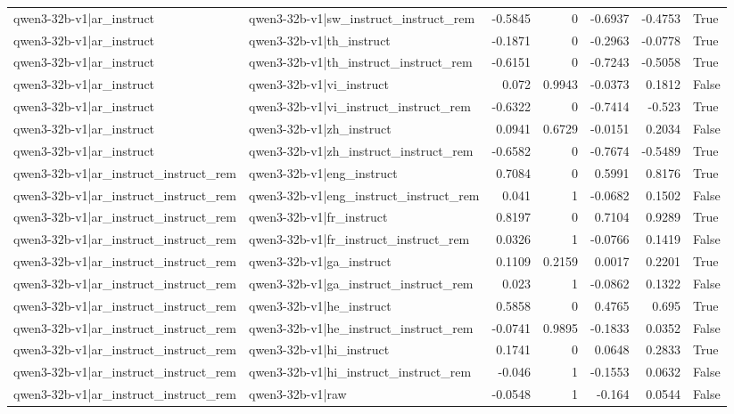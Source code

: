 \begin{table}
\begin{tabular}{l l r r r r l}
qwen3-32b-v1|ar_instruct & qwen3-32b-v1|sw_instruct_instruct_rem & -0.5845 & 0 & -0.6937 & -0.4753 & True \\
qwen3-32b-v1|ar_instruct & qwen3-32b-v1|th_instruct & -0.1871 & 0 & -0.2963 & -0.0778 & True \\
qwen3-32b-v1|ar_instruct & qwen3-32b-v1|th_instruct_instruct_rem & -0.6151 & 0 & -0.7243 & -0.5058 & True \\
qwen3-32b-v1|ar_instruct & qwen3-32b-v1|vi_instruct & 0.072 & 0.9943 & -0.0373 & 0.1812 & False \\
qwen3-32b-v1|ar_instruct & qwen3-32b-v1|vi_instruct_instruct_rem & -0.6322 & 0 & -0.7414 & -0.523 & True \\
qwen3-32b-v1|ar_instruct & qwen3-32b-v1|zh_instruct & 0.0941 & 0.6729 & -0.0151 & 0.2034 & False \\
qwen3-32b-v1|ar_instruct & qwen3-32b-v1|zh_instruct_instruct_rem & -0.6582 & 0 & -0.7674 & -0.5489 & True \\
qwen3-32b-v1|ar_instruct_instruct_rem & qwen3-32b-v1|eng_instruct & 0.7084 & 0 & 0.5991 & 0.8176 & True \\
qwen3-32b-v1|ar_instruct_instruct_rem & qwen3-32b-v1|eng_instruct_instruct_rem & 0.041 & 1 & -0.0682 & 0.1502 & False \\
qwen3-32b-v1|ar_instruct_instruct_rem & qwen3-32b-v1|fr_instruct & 0.8197 & 0 & 0.7104 & 0.9289 & True \\
qwen3-32b-v1|ar_instruct_instruct_rem & qwen3-32b-v1|fr_instruct_instruct_rem & 0.0326 & 1 & -0.0766 & 0.1419 & False \\
qwen3-32b-v1|ar_instruct_instruct_rem & qwen3-32b-v1|ga_instruct & 0.1109 & 0.2159 & 0.0017 & 0.2201 & True \\
qwen3-32b-v1|ar_instruct_instruct_rem & qwen3-32b-v1|ga_instruct_instruct_rem & 0.023 & 1 & -0.0862 & 0.1322 & False \\
qwen3-32b-v1|ar_instruct_instruct_rem & qwen3-32b-v1|he_instruct & 0.5858 & 0 & 0.4765 & 0.695 & True \\
qwen3-32b-v1|ar_instruct_instruct_rem & qwen3-32b-v1|he_instruct_instruct_rem & -0.0741 & 0.9895 & -0.1833 & 0.0352 & False \\
qwen3-32b-v1|ar_instruct_instruct_rem & qwen3-32b-v1|hi_instruct & 0.1741 & 0 & 0.0648 & 0.2833 & True \\
qwen3-32b-v1|ar_instruct_instruct_rem & qwen3-32b-v1|hi_instruct_instruct_rem & -0.046 & 1 & -0.1553 & 0.0632 & False \\
qwen3-32b-v1|ar_instruct_instruct_rem & qwen3-32b-v1|raw & -0.0548 & 1 & -0.164 & 0.0544 & False \\

\end{tabular}
\end{table}
